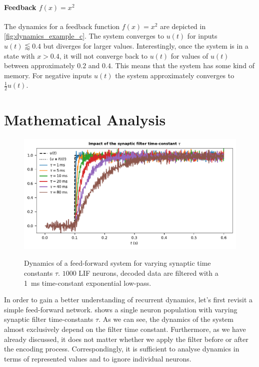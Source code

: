 \documentclass[10pt,letterpaper,oneside]{article}
\begin{document}
\paragraph{Feedback $f(x) = x^2$}
The dynamics for a feedback function $f(x) = x^2$ are depicted in \cref{fig:dynamics_example_c}. The system converges to $u(t)$ for inputs $u(t) \lessapprox 0.4$ but diverges for larger values. Interestingly, once the system is in a state with $x > 0.4$, it will not converge back to $u(t)$ for values of $u(t)$ between approximately $0.2$ and $0.4$. This means that the system has some kind of memory. For negative inputs $u(t)$ the system approximately converges to $\frac{1}2 u(t)$.

\section*{Mathematical Analysis}

\begin{figure}
	\centering
	\includegraphics{media/synaptic_filter.pdf}\\[-0.5cm]
	\caption{Dynamics of a feed-forward system for varying synaptic time constants $\tau$. $1000$ LIF neurons, decoded data are filtered with a \SI{1}{\milli\second} time-constant exponential low-pass. }
	\label{fig:synaptic_filter}
\end{figure}


In order to gain a better understanding of recurrent dynamics, let's first revisit a simple feed-forward network.  shows a single neuron population with varying synaptic filter time-constants $\tau$. As we can see, the dynamics of the system almost exclusively depend on the filter time constant. Furthermore, as we have already discussed, it does not matter whether we apply the filter before or after the encoding process. Correspondingly, it is sufficient to analyse dynamics in terms of represented values and to ignore individual neurons.
\end{document}
